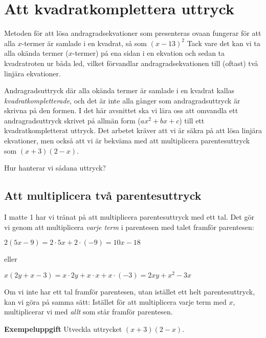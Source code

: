 \section{Att kvadratkomplettera uttryck}

Metoden för att lösa andragradsekvationer som presenteras ovaan fungerar för att alla $x$-termer är samlade i en kvadrat, så som $(x - 13)^2$
Tack vare det kan vi ta alla okända termer ($x$-termer) på ena sidan i en ekvation och sedan ta kvadratroten ur båda led, vilket förvandlar andragradsekvationen till (oftast) två linjära ekvationer.

Andragradsuttryck där alla okända termer är samlade i en kvadrat kallas \emph{kvadratkompletterade}, och det är inte alla gånger som andragradsuttryck är skrivna på den formen.
I det här avsnittet ska vi lära oss att omvandla ett andragradsuttryck skrivet på allmän form ($ax^2 + bx + c$) till ett kvadratkompletterat uttryck.
Det arbetet kräver att vi är säkra på att lösa linjära ekvationer, men också att vi är bekväma med att multiplicera parentesuttryck som $(x+3)(2-x)$.

Hur hanterar vi sådana uttryck?

\subsection{Att multiplicera två parentesuttryck}

I matte 1 har vi tränat på att multiplicera parentesuttryck med ett tal.
Det gör vi genom att multiplicera \emph{varje term} i parentesen med talet framför parentesen:

\begin{center}
$2(5x-9) = 2 \cdot 5x + 2 \cdot (-9) = 10x - 18$

eller

$x(2y+x-3) = x \cdot 2y + x \cdot x + x \cdot (-3) = 2xy + x^2 - 3x$
\end{center}

Om vi inte har ett tal framför parentesen, utan istället ett helt parentesuttryck, kan vi göra på samma sätt:
Istället för att multiplicera varje term med $x$, multiplicerar vi med \emph{allt} som står framför parentesen.

\textbf{Exempeluppgift}
Utveckla uttrycket $(x+3)(2-x)$.

